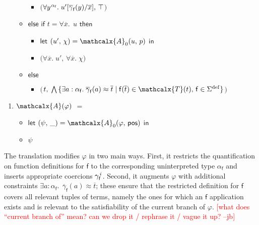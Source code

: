 \documentclass[runningheads,a4paper]{llncs}
\newcommand\return{}
\newcommand\bigtuple[1]{$\bigl(${#1}$\bigr)$}
\newcommand{\con}[1]{\mathsf{#1}}
\renewcommand\vec[1]{\overline{#1}}
\let\oldSigma=\Sigma
\def\Sigma{\mathrm{\oldSigma}}
\newcommand{\teq}{\approx}
\newcommand{\terms}{\mathcalx{T}}
\newcommand{\conv}{\mathcalx{A}}
\newcommand{\sfundefs}[1]{#1^\mathrm{def}}
\newcommand{\ppos}{\con{pos}}
\newcommand{\ltrue}{\top}
\newcommand\concret{\gamma} %
\newcommand{\vecfarg}[1]{\vec{\concret}_{#1}}
\newcommand{\fargx}[2]{\concret^{\vthinspace#2}_{#1}}
\newcommand{\fargsort}[1]{\alpha_{#1}}
\newcommand{\rem}[1]{\textcolor{red}{[#1]}}
\newcommand{\jb}[1]{\rem{#1 --jb}}
\newcommand{\vthinspace}{\kern+0.083333em}
\newcommand{\typ}[1]{^{\vthinspace #1}}
\begin{document}
\begin{enumerate}
\begin{itemize}
\begin{itemize}
      \item[] \return \bigtuple{$\forall y\typ{\fargsort{\con{f}}}.\; u' [ \vecfarg{\con{f}}( y ) / \vec x ],\, \ltrue$}
    \end{itemize}
  \item[] $\mathsf{else}$ $\mathsf{if}$ $t = \forall \vec x.\;\, u$ $\mathsf{then}$
    \begin{itemize}
      \item[] $\mathsf{let}$ $( u',\, \chi ) = \conv_0( u,\, p )$ $\mathsf{in}$
      \item[] \return \bigtuple{$\forall \vec x.\; u',\, \forall \vec x.\; \chi$}
    \end{itemize}
   \item[] $\mathsf{else}$
   \begin{itemize}
     \item[] \return \bigtuple{$t,\; \bigwedge\, \{ \exists a : \fargsort{\con{f}}.\; \vecfarg{\con{f}}( a ) \teq \vec t \mid \con{f}( \vec t ) \in \terms( t ),\, \con{f} \in \sfundefs{\Sigma} \}$}
   \end{itemize}
 \end{itemize}
\end{enumerate}
\begin{enumerate}
\item[\ ]
$\conv( \varphi )$ $=$
 \begin{itemize}
   \item[] $\mathsf{let}$ $( \psi,\, \_ ) = \conv_0( \varphi,\, \ppos )$ $\mathsf{in}$
   \item[] \return $\psi$
  \end{itemize}
\end{enumerate}


The translation modifies $\varphi$ in two main ways. First, it restricts the
quantification on function definitions for $\con{f}$ to the corresponding
uninterpreted type $\fargsort{\con{f}}$ and inserts appropriate coercions
$\fargx{\con{f}}{i}$. Second, it augments $\varphi$ with additional constraints
$\exists a : \fargsort{\con{f}}.\;\, \vecfarg{\con{f}}( a ) \teq \vec t$; these
ensure that the restricted definition for $\con{f}$ covers all relevant tuples
of terms, namely the ones for which an $\con{f}$ application exists and is
relevant to the satisfiability of the current branch of $\varphi$.
\jb{what does ``current branch of'' mean? can we drop it / rephrase it / vague
it up?}
\end{document}
